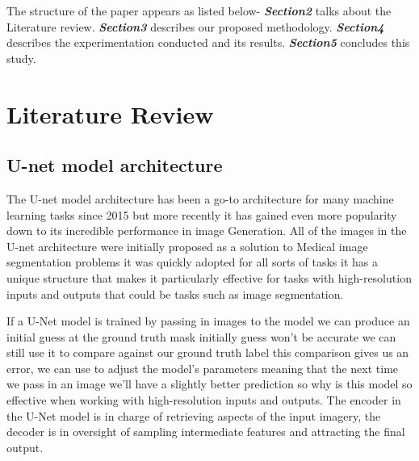 \documentclass[runningheads]{llncs}
\begin{document}
The structure of the paper appears as listed below- \textbf{\textit{Section2}} talks about the Literature review. \textbf{\textit{Section3 }}describes our proposed methodology. \textbf{\textit{Section4 }}describes the experimentation conducted and its results. \textbf{\textit{Section5}}  concludes this study.



\section{Literature Review}
\label{back}
\subsection{U-net model architecture}
The U-net model architecture has been a go-to architecture for many machine learning tasks since 2015 but more recently it has gained even more popularity down to its incredible performance in image Generation. All of the images in the U-net architecture were initially proposed as a solution to Medical image segmentation problems it was quickly adopted for all sorts of tasks it has a unique structure that makes it particularly effective for tasks with high-resolution inputs and outputs that could be tasks such as image segmentation.

If a U-Net model is trained by passing in images to the model we can produce an
initial guess at the ground truth mask initially guess won’t be accurate we can still use it
to compare against our ground truth label this comparison gives us an error, we can use
to adjust the model’s parameters meaning that the next time we pass in an image we’ll
have a slightly better prediction so why is this model so effective when working with
high-resolution inputs and outputs. The encoder in the U-Net model is in charge of 
retrieving aspects of the input imagery, the decoder is in oversight of sampling intermediate 
features and attracting the final output. 
\end{document}
